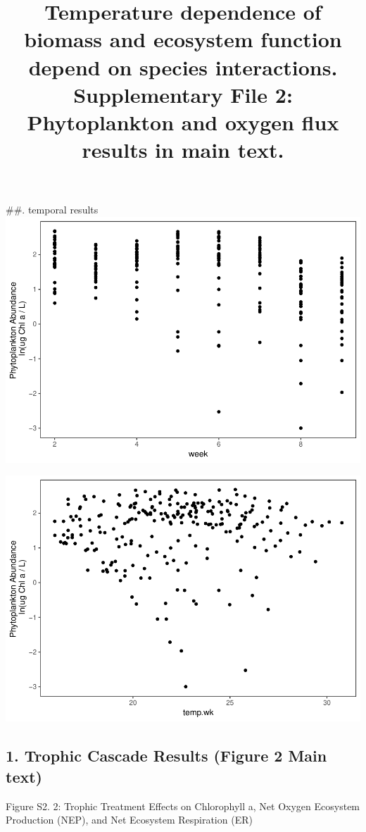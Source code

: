 \documentclass[]{article}
\title{Temperature dependence of biomass and ecosystem function depend on
species interactions. Supplementary File 2: Phytoplankton and oxygen
flux results in main text.}
\author{}
\date{}
\begin{document}
\maketitle

\#\#. temporal results
\includegraphics{Garzke_markdown_files/figure-latex/unnamed-chunk-2-1.pdf}

\includegraphics{Garzke_markdown_files/figure-latex/unnamed-chunk-3-1.pdf}

\subsection{1. Trophic Cascade Results (Figure 2 Main
text)}\label{trophic-cascade-results-figure-2-main-text}

Figure S2. 2: Trophic Treatment Effects on Chlorophyll a, Net Oxygen
Ecosystem Production (NEP), and Net Ecosystem Respiration (ER)
\end{document}
